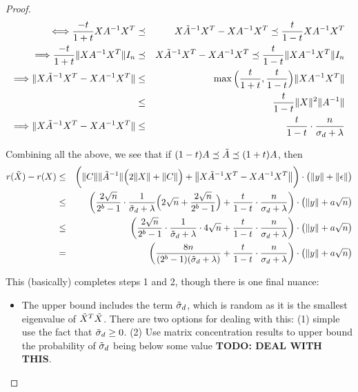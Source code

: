 \documentclass[12pt]{article}
\begin{document}
\begin{proof}
\begin{eqnarray*}
		\Longleftrightarrow \frac{-t}{1+t}X A^{-1}X^T &\preceq& X \tA^{-1}X^T - XA^{-1}X^T \preceq \frac{t}{1-t}X A^{-1}X^T \\
		\Longrightarrow \frac{-t}{1+t}\|XA^{-1}X^T\| I_n &\preceq&  X \tA^{-1}X^T - XA^{-1}X^T \preceq \frac{t}{1-t}\|X A^{-1}X^T\|I_n \\
		\Longrightarrow  \|X \tA^{-1}X^T - XA^{-1}X^T\| &\leq&  \max\Big(\frac{t}{1+t},\frac{t}{1-t}\Big)\|X A^{-1}X^T\|\\
		&\leq&  \frac{t}{1-t}\|X\|^2 \|A^{-1}\|\\
		\Longrightarrow  \|X \tA^{-1}X^T - XA^{-1}X^T\| &\leq&  \frac{t}{1-t}\cdot \frac{n}{\sigma_d+\lambda}
	\end{eqnarray*}
	
	Combining all the above, we see that if $(1-t)A \preceq \tA \preceq (1+t)A$, then
	\begin{eqnarray*}
		r(\tX) - r(X) &\leq& \bigg(\|C\| \|\tA^{-1}\|\Big(2\|X\| + \|C\|\Big) + \big\|X \tA^{-1} X^T - X A^{-1} X^T\big\|\bigg)\cdot \big(\|y\| + \|\eps\|\big) \\
		&\leq& \bigg(\frac{2\sqrt{n}}{2^b-1}\cdot \frac{1}{\tsigma_d + \lambda}\Big(2\sqrt{n} +\frac{2\sqrt{n}}{2^b-1}\Big) +\frac{t}{1-t}\cdot \frac{n}{\sigma_d+\lambda}\bigg)\cdot \big(\|y\| + a\sqrt{n}\big) \\
		&\leq& \bigg(\frac{2\sqrt{n}}{2^b-1}\cdot \frac{1}{\tsigma_d + \lambda}\cdot 4\sqrt{n} +\frac{t}{1-t}\cdot \frac{n}{\sigma_d+\lambda}\bigg)\cdot \big(\|y\| + a\sqrt{n}\big) \\
		&=& \bigg(\frac{8n}{(2^b-1)(\tsigma_d + \lambda)} +\frac{t}{1-t}\cdot \frac{n}{\sigma_d+\lambda}\bigg)\cdot \big(\|y\| + a\sqrt{n}\big) 
	\end{eqnarray*}
	
	This (basically) completes steps 1 and 2, though there is one final nuance:
	\begin{itemize}
		\item The upper bound includes the term $\tsigma_d$, which is random as it is the smallest eigenvalue of $\tX^T\tX$. There are two options for dealing with this: (1) simple use the fact that $\tsigma_d \geq 0$. (2) Use matrix concentration results to upper bound the probability of $\tsigma_d$ being below some value \textbf{TODO: DEAL WITH THIS}.
	\end{itemize}
	

\end{proof}
\end{document}
